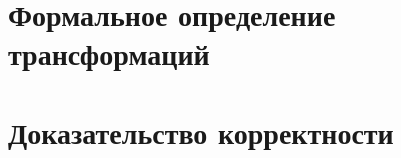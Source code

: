 \section{Формальное определение трансформаций}\label{sec:appendix-transformations}

\newpage
\section{Доказательство корректности}
